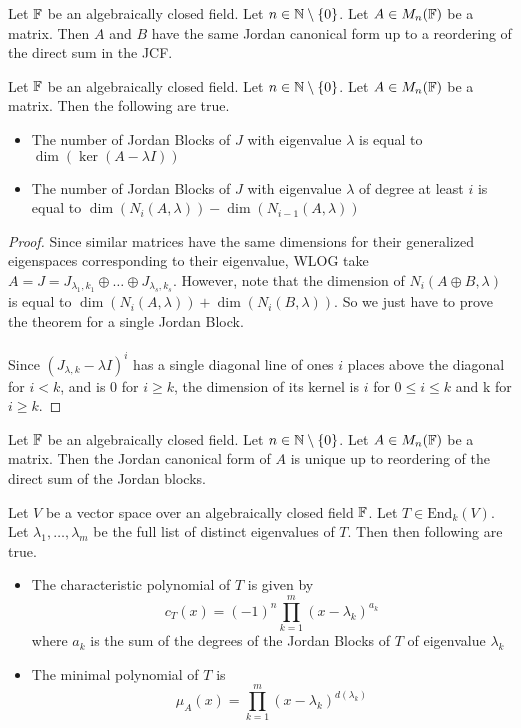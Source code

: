 \documentclass[a4paper]{article}
\begin{document}
\begin{lmm}{}{} Let $\mathbb{F}$ be an algebraically closed field. Let $n\in\mathbb{N}\setminus\{0\}$. Let $A\in M_n(\mathbb{F})$ be a matrix. Then $A$ and $B$ have the same Jordan canonical form up to a reordering of the direct sum in the JCF. 
\end{lmm}

\begin{prp}{}{} Let $\mathbb{F}$ be an algebraically closed field. Let $n\in\mathbb{N}\setminus\{0\}$. Let $A\in M_n(\mathbb{F})$ be a matrix. Then the following are true. 
\begin{itemize}
\item The number of Jordan Blocks of $J$ with eigenvalue $\lambda$ is equal to $\dim(\ker(A-\lambda I))$
\item The number of Jordan Blocks of $J$ with eigenvalue $\lambda$ of degree at least $i$ is equal to $\dim(N_i(A,\lambda))-\dim(N_{i-1}(A,\lambda))$
\end{itemize}\tcbline\begin{proof} Since similar matrices have the same dimensions for their generalized eigenspaces corresponding to their eigenvalue, WLOG take $A=J=J_{\lambda_1,k_1}\oplus\dots\oplus J_{\lambda_s,k_s}$. However, note that the dimension of $N_i(A\oplus B,\lambda)$ is equal to $\dim(N_i(A,\lambda))+\dim(N_i(B,\lambda))$. So we just have to  prove the theorem for a single Jordan Block. \\~\\
Since $(J_{\lambda,k}-\lambda I)^i$ has a single diagonal line of ones $i$ places above the diagonal for $i<k$, and is $0$ for $i\geq k$, the dimension of its kernel is $i$ for $0\leq i\leq k$ and k for $i\geq k$. 
\end{proof}
\end{prp}

\begin{prp}{}{} Let $\mathbb{F}$ be an algebraically closed field. Let $n\in\mathbb{N}\setminus\{0\}$. Let $A\in M_n(\mathbb{F})$ be a matrix. Then the Jordan canonical form of $A$ is unique up to reordering of the direct sum of the Jordan blocks. 
\end{prp}

\begin{prp}{}{} Let $V$ be a vector space over an algebraically closed field $\mathbb{F}$. Let $T\in\text{End}_k(V)$. Let $\lambda_1,\dots,\lambda_m$ be the full list of distinct eigenvalues of $T$. Then then following are true. 
\begin{itemize}
\item The characteristic polynomial of $T$ is given by $$c_T(x)=(-1)^n\prod_{k=1}^m(x-\lambda_k)^{a_k}$$ where $a_k$ is the sum of the degrees of the Jordan Blocks of $T$ of eigenvalue $\lambda_k$
\item The minimal polynomial of $T$ is $$\mu_A(x)=\prod_{k=1}^m(x-\lambda_k)^{d(\lambda_k)}$$
\end{itemize}
\end{prp}
\end{document}

